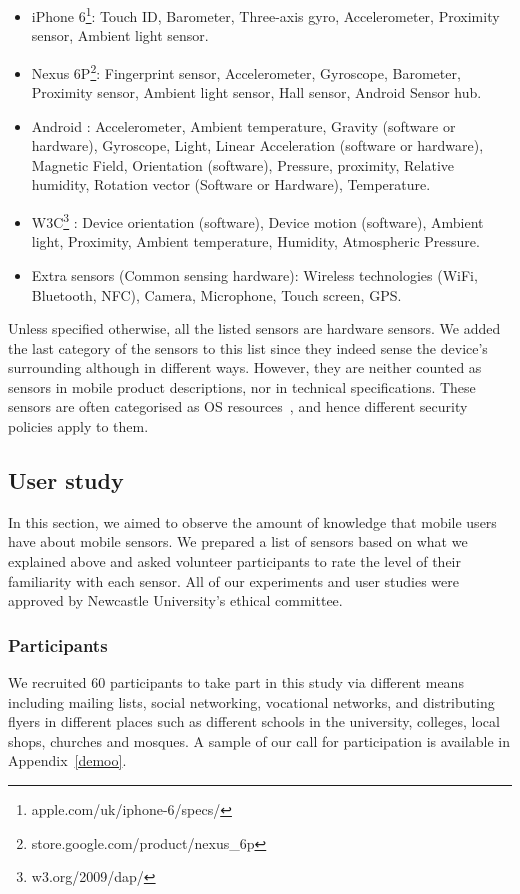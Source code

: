 \documentclass[10pt,twocolumn]{article}
\begin{document}
\begin{itemize}
\item iPhone 6\footnote{apple.com/uk/iphone-6/specs/}: 
Touch ID, Barometer, Three-axis gyro, Accelerometer, Proximity sensor, Ambient light sensor.

\item Nexus 6P\footnote{store.google.com/product/nexus\_6p}:    Fingerprint sensor, Accelerometer, Gyroscope, Barometer, Proximity sensor, Ambient light sensor, Hall sensor, Android Sensor hub.

\item Android \cite{AndDev}: Accelerometer, Ambient temperature, Gravity (software or hardware), Gyroscope, Light, Linear Acceleration (software or hardware), Magnetic Field, Orientation (software), Pressure, proximity, Relative humidity, Rotation vector (Software or Hardware), Temperature. 

\item W3C\footnote{w3.org/2009/dap/} \cite{W3CMotion}: Device orientation (software), Device motion (software), Ambient light, Proximity, Ambient temperature, Humidity, Atmospheric Pressure. 

\item Extra sensors (Common sensing hardware): Wireless technologies (WiFi, Bluetooth, NFC), Camera, Microphone, Touch screen, GPS.    
\end{itemize} 

Unless specified otherwise, all the listed sensors are hardware sensors. We added the last category of the sensors to this list since they indeed sense the device's surrounding although in different ways. However, they are neither counted as sensors in mobile product descriptions, nor in technical specifications. These sensors are often categorised as OS resources~\cite{resources}, and hence different security policies apply to them. 
 

\subsection{User study}
\label{refff}
In this section, we aimed to observe the amount of knowledge that mobile users have about mobile sensors. We prepared a list of sensors based on what we explained above and asked volunteer participants to rate the level of their familiarity with each sensor.
All of our experiments and user studies were approved by Newcastle University's ethical committee.

\subsubsection{Participants}
We recruited 60 participants to take part in this study via different means including mailing lists, social networking, vocational networks, and distributing flyers in different places such as different schools in the university, colleges, local shops, churches and mosques. A sample of our call for participation is available in Appendix~\ref{demoo}.
\end{document}
